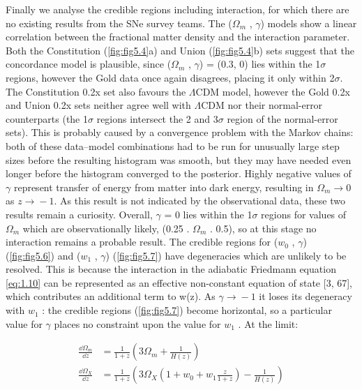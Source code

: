 Finally we analyse the credible regions including interaction, for which there are no existing results from the SNe survey teams. The ($\Omega_m$ , $\gamma$) models show a linear correlation between the fractional matter density and the interaction parameter. Both the Constitution (\cref{fig:fig5.4}a) and Union (\cref{fig:fig5.4}b) sets suggest that the concordance model is plausible, since ($\Omega_m$ , $\gamma$) = (0.3, 0) lies within the 1$\sigma$ regions, however the Gold data once again disagrees, placing it only within 2$\sigma$. The Constitution 0.2x set also favours the $\Lambda$CDM model, however the Gold 0.2x and Union 0.2x sets neither agree well with $\Lambda$CDM nor their normal-error counterparts (the 1$\sigma$ regions intersect the 2 and 3$\sigma$ region of the normal-error sets). 
This is probably caused by a convergence problem with the Markov chains: both of these data–model combinations had to be run for unusually large step sizes before the resulting histogram was smooth, but they may have needed even longer before the histogram converged to the posterior. Highly negative values of $\gamma$ represent transfer of energy from matter into dark energy, resulting in $\Omega_m \rightarrow{} 0$ as $z \rightarrow{} -1$. As this result is not indicated by the observational data, these two results remain a curiosity. Overall, $\gamma$ = 0 lies within the 1$\sigma$ regions for values of $\Omega_m$ which are observationally likely, (0.25 . $\Omega_m$ . 0.5), so at this stage no interaction remains a probable result. 
The credible regions for ($w_0$ , $\gamma$) (\cref{fig:fig5.6}) and ($w_1$ , $\gamma$) (\cref{fig:fig5.7}) have degeneracies which are unlikely to be resolved. This is because the interaction in the adiabatic Friedmann equation \cref{eq:1.10} can be represented as an effective non-constant equation of state [3, 67], which contributes an additional term to w(z). As $\gamma \rightarrow{} -1$ it loses its degeneracy with $w_1$ : the credible regions (\cref{fig:fig5.7}) become horizontal, so a particular value for $\gamma$ places no constraint upon the value for $w_1$ . At the limit:

\begin{subequations}
\label{eq:5.1}
\begin{align}
    \frac{\dd{\Omega}_{m}}{\dd{z}} &=
    \frac{1}{1+z} \left(
        3 \Omega_{m} + \frac{1}{H(z)}
    \right)
    \label{eq:5.1a} \\
    \frac{\dd{\Omega}_{X}}{\dd{z}} &=
    \frac{1}{1+z} \left(
        3 \Omega_{X} \left(
            1 + w_{0} + w_{1} \frac{z}{1+z}
        \right)
        - \frac{1}{H(z)}
    \right)
    \label{eq:5.1b}
\end{align}
\end{subequations}

